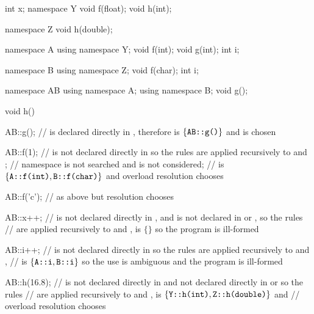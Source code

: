 \begin{example}
\begin{codeblock}
int x;
namespace Y {
  void f(float);
  void h(int);
}

namespace Z {
  void h(double);
}

namespace A {
  using namespace Y;
  void f(int);
  void g(int);
  int i;
}

namespace B {
  using namespace Z;
  void f(char);
  int i;
}

namespace AB {
  using namespace A;
  using namespace B;
  void g();
}

void h()
{
  AB::g();          //  is declared directly in , therefore  is $\{ \texttt{AB::g()} \}$ and  is chosen

  AB::f(1);         //  is not declared directly in  so the rules are applied recursively to  and ;
                    // namespace  is not searched and  is not considered;
                    //  is $\{ \texttt{A::f(int)}, \texttt{B::f(char)} \}$ and overload resolution chooses 

  AB::f('c');       // as above but resolution chooses 

  AB::x++;          //  is not declared directly in , and is not declared in  or , so the rules
                    // are applied recursively to  and ,  is $\{ \}$ so the program is ill-formed

  AB::i++;          //  is not declared directly in  so the rules are applied recursively to  and ,
                    //  is $\{ \texttt{A::i}, \texttt{B::i} \}$ so the use is ambiguous and the program is ill-formed

  AB::h(16.8);      //  is not declared directly in  and not declared directly in  or  so the rules
                    // are applied recursively to  and ,  is $\{ \texttt{Y::h(int)}, \texttt{Z::h(double)} \}$ and
                    // overload resolution chooses 
}
\end{codeblock}
\end{example}

